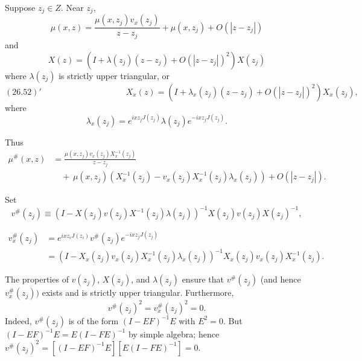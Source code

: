 \documentclass{surv-l}
\theoremstyle{plain}
\theoremstyle{definition}
\numberwithin{equation}{chapter}
\begin{document}
Suppose $z_{j}\in Z$. Near $z_{j}$,
\begin{equation}\label{eq26.51}
\mu(x,z)=\frac{\mu(x,z_{j})v_{x}(z_{j})}{z-z_{j}}+\mu(x, z_{j})+O(|z-z_{j}|)
\end{equation}
and
\begin{equation}\label{eq26.52}
X(z)=(I+\lambda(z_{j})(z-z_{j})+O(|z-z_{j}|)^{2})X(z_{j})
\end{equation}
where $\lambda(z_{j})$ is strictly upper triangular, or
\begin{equation*}
(26.52)'\qquad\qquad\qquad\qquad\qquad X_{x}(z)=(I+\lambda_{x}(z_{j})(z-z_{j})+O(|z-z_{j}|)^{2})X_{x}(z_{j}),
\end{equation*}
where
\renewcommand\theequation{26.\arabic{equation}}
\setcounter{equation}{52}
\begin{equation}\label{eq26.53}
\lambda_{x}(z_{j})=e^{ixz_{j}J(z_{j})}\lambda(z_{j})e^{-ixz_{j}J(z_{j})}.
\end{equation}

Thus
\begin{align}\label{eq26.54}
\displaystyle \mu^{\#}(x,z)&=\frac{\mu(x,z_{j})v_{x}(z_{j})X_{x}^{-1}(z_{j})}{z-z_{j}}\\ \nonumber
&\quad+\,\mu(x, z_{j})(X_{x}^{-1}(z_{j})-v_{x}(z_{j})X_{x}^{-1}(z_{j})\lambda_{x}(z_{j}))+O(|z-z_{j}|).
\end{align}

Set
\begin{equation}\label{eq26.55}
v^{\#}(z_{j})\equiv(I-X(z_{j})v(z_{j})X^{-1}(z_{j})\lambda(z_{j}))^{-1}X(z_{j})v(z_{j})X(z_{j})^{-1},
\end{equation}

\begin{align}\label{al26.56}
v_{x}^{\#}(z_{j})&=e^{ixz_{i}J(z_{i})}v^{\#}(z_{j})e^{-ixz_{j}J(z_{j})}\\ \nonumber
&=(I-X_{x}(z_{j})v_{x}(z_{j})X_{x}^{-1}(z_{j})\lambda_{x}(z_{j}))^{-1}X_{x}(z_{j})v_{x}(z_{j})X_{x}^{-1}(z_{j}).
\end{align}

The properties of $v(z_{j})$, $X(z_{j})$, and $\lambda(z_{j})$ ensure that $v^{\#}(z_{j})$ (and hence $v_{x}^{\#}(z_{j}))$ exists and is strictly upper triangular. Furthermore,
\begin{equation}\label{eq26.57}
v^{\#}(z_{j})^{2}=v_{x}^{\#}(z_{j})^{2}=0.
\end{equation}
Indeed, $v^{\#}(z_{j})$ is of the form $(I-EF)^{-1}E$ with $E^{2}=0$. But $(I-EF)^{-1}E= E(I-FE)^{-1}$ by simple algebra; hence $v^{\#}(z_{j})^{2}=[(I-EF)^{-1}E][E(I-FE)^{-1}] =0$.
\end{document}
